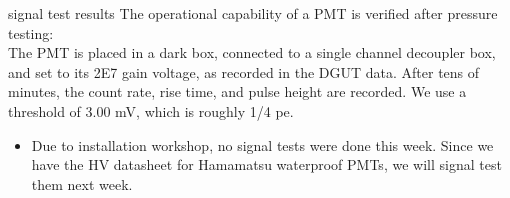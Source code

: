\documentclass{beamer}
\begin{document}
\begin{frame}{signal test results}
	\small The operational capability of a PMT is verified after pressure testing:\\
	{\scriptsize The PMT is placed in a dark box, connected to a single channel decoupler box,
	and set to its 2E7 gain voltage, as recorded in the DGUT data. After tens of minutes,
	the count rate, rise time, and pulse height are recorded. We use a threshold of 3.00 
	mV, which is roughly 1/4 pe.
	}

	\setlength{\tabcolsep}{2pt}
	\small
	\begin{center}
		\begin{itemize}
			\item Due to installation workshop, no signal tests were done this week. Since 
			we have the HV datasheet for Hamamatsu waterproof PMTs, we will signal test them
			next week.
		\end{itemize}

	\end{center}
\end{frame}
\end{document}
